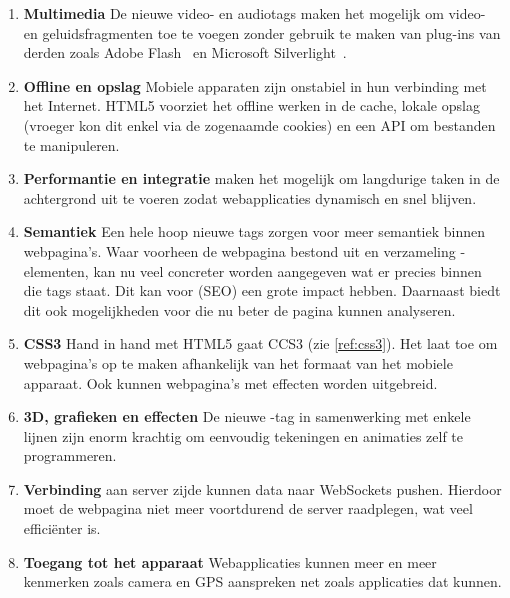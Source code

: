 \begin{enumerate}
\item \textbf{Multimedia} 
De nieuwe video- en audiotags maken het mogelijk om video- en geluidsfragmenten toe te voegen zonder gebruik te maken van plug-ins van derden zoals Adobe Flash~\cite{Adobe2013} en Microsoft Silverlight~\cite{Microsoft2013}.

\item \textbf{Offline en opslag}  
Mobiele apparaten zijn onstabiel in hun verbinding met het Internet. HTML5 voorziet het offline werken in de cache, lokale opslag (vroeger kon dit enkel via de zogenaamde cookies) en een API om bestanden te manipuleren.

\item \textbf{Performantie en integratie}
 maken het mogelijk om langdurige \js{} taken in de achtergrond uit te voeren zodat webapplicaties dynamisch en snel blijven.

\item \textbf{Semantiek}
Een hele hoop nieuwe tags zorgen voor meer semantiek binnen webpagina's. 
Waar voorheen de webpagina bestond uit en verzameling -elementen, kan nu veel concreter worden aangegeven wat er precies binnen die tags staat. 
Dit kan voor  (SEO) een grote impact hebben. 
Daarnaast biedt dit ook mogelijkheden voor  die nu beter de pagina kunnen analyseren.

\item \textbf{CSS3}
Hand in hand met HTML5 gaat CCS3 (zie \ref{ref:css3}). 
Het laat toe om webpagina's op te maken afhankelijk van het formaat van het mobiele apparaat. 
Ook kunnen webpagina's met effecten worden uitgebreid. 

\item \textbf{3D, grafieken en effecten}
De nieuwe -tag in samenwerking met enkele lijnen \js{} zijn enorm krachtig om eenvoudig tekeningen en animaties zelf te programmeren.

\item \textbf{Verbinding}
 aan server zijde kunnen data naar WebSockets pushen. Hierdoor moet de webpagina niet meer voortdurend de server raadplegen, wat veel efficiënter is.

\item \textbf{Toegang tot het apparaat}
Webapplicaties kunnen meer en meer kenmerken zoals camera en GPS aanspreken net zoals  applicaties dat kunnen. 
\end{enumerate}

